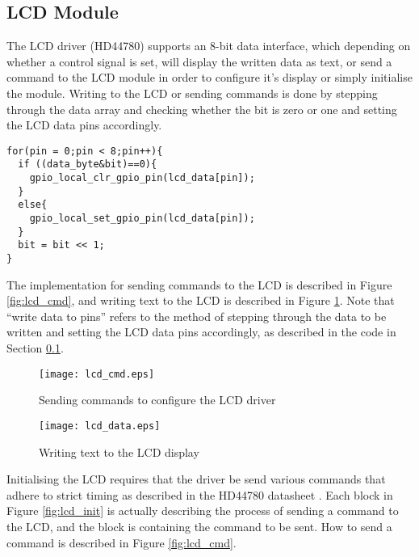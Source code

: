 \documentclass[11pt, a4paper, oneside]{Thesis} %
\begin{document}
\subsection{LCD Module}\label{sec:lcd_module}
The LCD driver (HD44780) supports an 8-bit data interface, which depending on whether a control signal is set, will display the written data as text, or send a command to the LCD module in order to configure it's display or simply initialise the module. Writing to the LCD or sending commands is done by stepping through the data array and checking whether the bit is zero or one and setting the LCD data pins accordingly.
 
\begin{verbatim}
for(pin = 0;pin < 8;pin++){		
  if ((data_byte&bit)==0){
    gpio_local_clr_gpio_pin(lcd_data[pin]);
  }
  else{
    gpio_local_set_gpio_pin(lcd_data[pin]);
  }
  bit = bit << 1;
}
\end{verbatim}

The implementation for sending commands to the LCD is described in Figure \ref{fig:lcd_cmd}, and writing text to the LCD is described in Figure \ref{fig:lcd_data}. Note that ``write data to pins'' refers to the method of stepping through the data to be written and setting the LCD data pins accordingly, as described in the code in Section \ref{sec:lcd_module}.

\begin{figure}[htbp]
  \begin{minipage}[b]{0.5\linewidth}
    \centering
    \texttt{[image: lcd\_cmd.eps]}
    \caption{Sending commands to configure the LCD driver}
    \label{fig:lcd_cmd}
  \end{minipage}
  \hspace{0.5cm}
  \begin{minipage}[b]{0.5\linewidth}
    \centering
    \texttt{[image: lcd\_data.eps]}
    \caption{Writing text to the LCD display}
    \label{fig:lcd_data}
  \end{minipage}
\end{figure}

Initialising the LCD requires that the driver be send various commands that adhere to strict timing as described in the HD44780 datasheet \cite{hd44780}. Each block in Figure \ref{fig:lcd_init} is actually describing the process of sending a command to the LCD, and the block is containing the command to be sent. How to send a command is described in Figure \ref{fig:lcd_cmd}.
\end{document}
